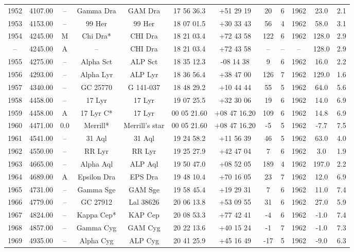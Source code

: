 \begin{table}
\begin{tabular}{cccccccccccc}
1952 & 4107.00 & -- & Gamma Dra & GAM Dra & 17 56 36.3 & +51 29 19 & 20 & 6 & 1962 & 23.0 & 2.1 \\
1953 & 4153.00 & -- & 99 Her & 99 Her & 18 07 01.5 & +30 33 43 & 56 & 4 & 1962 & 58.0 & 3.1 \\
1954 & 4245.00 & M & Chi Dra* & CHI Dra & 18 21 03.4 & +72 43 58 & 122 & 6 & 1962 & 128.0 & 2.9 \\
-- & 4245.00 & A & -- & CHI Dra & 18 21 03.4 & +72 43 58 & -- & -- & -- & 128.0 & 2.9 \\
1955 & 4275.00 & -- & Alpha Sct & ALP Sct & 18 35 12.3 & -08 14 38 & 9 & 6 & 1962 & 16.0 & 2.2 \\
1956 & 4293.00 & -- & Alpha Lyr & ALP Lyr & 18 36 56.4 & +38 47 00 & 126 & 7 & 1962 & 129.0 & 1.6 \\
1957 & 4340.00 & -- & GC 25770 & G 141-037 & 18 48 29.2 & +10 44 44 & 55 & 5 & 1962 & 64.0 & 5.6 \\
1958 & 4458.00 & -- & 17 Lyr & 17 Lyr & 19 07 25.5 & +32 30 06 & 19 & 6 & 1962 & 14.0 & 6.9 \\
1959 & 4458.00 & A & 17 Lyr C* & 17 Lyr & 00 05 21.60 & +08 47 16.20 & 109 & 6 & 1962 & 14.8 & 6.9 \\
1960 & 4471.00 & 0.0 & Merrill* & Merrill's star & 00 05 21.60 & +08 47 16.20 & -5 & 5 & 1962 & -7.7 & 7.5 \\
1961 & 4541.00 & -- & 31 Aql & 31 Aql & 19 24 58.2 & +11 56 39 & 46 & 5 & 1962 & 63.0 & 4.0 \\
1962 & 4550.00 & -- & RR Lyr & RR Lyr & 19 25 27.9 & +42 47 04 & 7 & 6 & 1962 & 3.0 & 1.9 \\
1963 & 4665.00 & -- & Alpha Aql & ALP Aql & 19 50 47.0 & +08 52 05 & 189 & 4 & 1962 & 197.0 & 2.2 \\
1964 & 4689.00 & A & Epsilon Dra & EPS Dra & 19 48 10.4 & +70 16 05 & 23 & 7 & 1962 & 12.0 & 6.9 \\
1965 & 4731.00 & -- & Gamma Sge & GAM Sge & 19 58 45.4 & +19 29 31 & 7 & 6 & 1962 & 11.0 & 7.4 \\
1966 & 4779.00 & -- & GC 27912 & Lal 38626 & 20 06 13.8 & +53 09 55 & 31 & 6 & 1962 & 27.0 & 5.9 \\
1967 & 4824.00 & -- & Kappa Cep* & KAP Cep & 20 08 53.3 & +77 42 41 & -4 & 6 & 1962 & -1.0 & 7.4 \\
1968 & 4857.00 & -- & Gamma Cyg & GAM Cyg & 20 22 13.6 & +40 15 24 & -1 & 7 & 1962 & -1.0 & 7.3 \\
1969 & 4935.00 & -- & Alpha Cyg & ALP Cyg & 20 41 25.9 & +45 16 49 & -17 & 5 & 1962 & -9.0 & 6.3 \\

\end{tabular}
\end{table}
